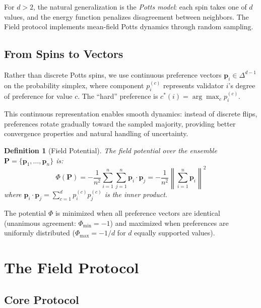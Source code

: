\documentclass[11pt,a4paper]{article}
\newtheorem{definition}{Definition}[section]
\begin{document}
For $d > 2$, the natural generalization is the \emph{Potts model}: each spin takes
one of $d$ values, and the energy function penalizes disagreement between neighbors.
The Field protocol implements mean-field Potts dynamics through random sampling.

\subsection{From Spins to Vectors}

Rather than discrete Potts spins, we use continuous preference vectors
$\mathbf{p}_i \in \Delta^{d-1}$ on the probability simplex, where component $p_i^{(c)}$
represents validator $i$'s degree of preference for value $c$. The ``hard'' preference
is $c^*(i) = \arg\max_c p_i^{(c)}$.

This continuous representation enables smooth dynamics: instead of discrete flips,
preferences rotate gradually toward the sampled majority, providing better convergence
properties and natural handling of uncertainty.

\begin{definition}[Field Potential]
\label{def:potential}
The field potential over the ensemble $\mathbf{P} = \{\mathbf{p}_1, \ldots, \mathbf{p}_n\}$ is:
\begin{equation}
\Phi(\mathbf{P}) = -\frac{1}{n^2} \sum_{i=1}^{n} \sum_{j=1}^{n} \mathbf{p}_i \cdot \mathbf{p}_j
= -\frac{1}{n^2} \left\| \sum_{i=1}^{n} \mathbf{p}_i \right\|^2
\label{eq:potential}
\end{equation}
where $\mathbf{p}_i \cdot \mathbf{p}_j = \sum_{c=1}^{d} p_i^{(c)} p_j^{(c)}$ is the inner product.
\end{definition}

The potential $\Phi$ is minimized when all preference vectors are identical (unanimous
agreement: $\Phi_{\min} = -1$) and maximized when preferences are uniformly distributed
($\Phi_{\max} = -1/d$ for $d$ equally supported values).

\section{The Field Protocol}
\label{sec:protocol}

\subsection{Core Protocol}
\end{document}
